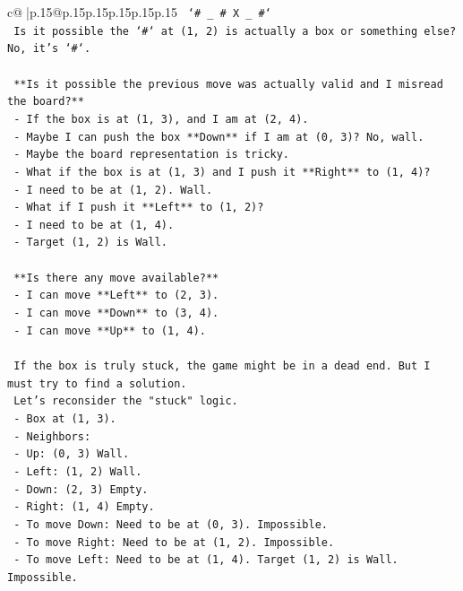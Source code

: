 \documentclass{article}
\begin{document}
{\begin{supertabular}{c@{$\;$}|p{.15\linewidth}@{}p{.15\linewidth}p{.15\linewidth}p{.15\linewidth}p{.15\linewidth}p{.15\linewidth}}
{{{\texttt{  `\# \_ \# X \_ \#`} \\
\texttt{  Is it possible the `\#` at (1, 2) is actually a box or something else? No, it's `\#`.} \\
\\ 
\texttt{  **Is it possible the previous move was actually valid and I misread the board?**} \\
\texttt{  {-} If the box is at (1, 3), and I am at (2, 4).} \\
\texttt{  {-} Maybe I can push the box **Down** if I am at (0, 3)? No, wall.} \\
\texttt{  {-} Maybe the board representation is tricky.} \\
\texttt{  {-} What if the box is at (1, 3) and I push it **Right** to (1, 4)?} \\
\texttt{    {-} I need to be at (1, 2). Wall.} \\
\texttt{  {-} What if I push it **Left** to (1, 2)?} \\
\texttt{    {-} I need to be at (1, 4).} \\
\texttt{    {-} Target (1, 2) is Wall.} \\
\\ 
\texttt{  **Is there any move available?**} \\
\texttt{  {-} I can move **Left** to (2, 3).} \\
\texttt{  {-} I can move **Down** to (3, 4).} \\
\texttt{  {-} I can move **Up** to (1, 4).} \\
\\ 
\texttt{  If the box is truly stuck, the game might be in a dead end. But I must try to find a solution.} \\
\texttt{  Let's reconsider the "stuck" logic.} \\
\texttt{  {-} Box at (1, 3).} \\
\texttt{  {-} Neighbors:} \\
\texttt{    {-} Up: (0, 3) Wall.} \\
\texttt{    {-} Left: (1, 2) Wall.} \\
\texttt{    {-} Down: (2, 3) Empty.} \\
\texttt{    {-} Right: (1, 4) Empty.} \\
\texttt{  {-} To move Down: Need to be at (0, 3). Impossible.} \\
\texttt{  {-} To move Right: Need to be at (1, 2). Impossible.} \\
\texttt{  {-} To move Left: Need to be at (1, 4). Target (1, 2) is Wall. Impossible.} \\
}}}
\end{supertabular}}
\end{document}
